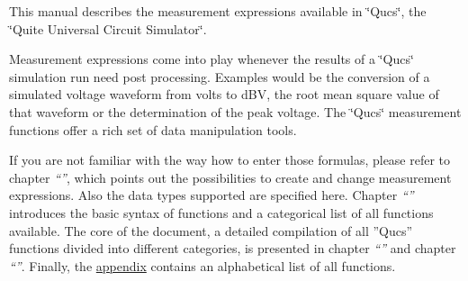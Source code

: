This manual describes the measurement expressions available in
\char`\"{}Qucs\char`\"{}, the \char`\"{}Quite Universal Circuit
Simulator\char`\"{}.

Measurement expressions come into play whenever the results of a
\char`\"{}Qucs\char`\"{} simulation run need post processing. Examples
would be the conversion of a simulated voltage waveform from volts to
dBV, the root mean square value of that waveform or the determination
of the peak voltage. The
\char`\"{}Qucs\char`\"{} measurement functions offer a rich set of
data manipulation tools.

If you are not familiar with the way how to enter those formulas,
please refer to chapter \textit{``''}, which
points out the possibilities to create and change measurement
expressions. Also the data types supported are specified here. Chapter
\textit{``''} introduces the basic syntax of
functions and a categorical list of all functions available. The core
of the document, a detailed compilation of all ''Qucs'' functions
divided into different categories, is presented in chapter
\textit{``''} and chapter
\textit{``''}.  Finally, the
\hyperlink{chapter:appendix}{appendix} contains an alphabetical list
of all functions.
